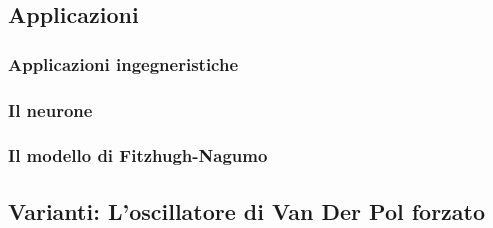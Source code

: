 \documentclass[12pt]{article}
\begin{document}
\subsection{Applicazioni}
\subsubsection{Applicazioni ingegneristiche \\}
\subsubsection{Il neurone \\}
\subsubsection{Il modello di Fitzhugh-Nagumo \\}
\subsection{Varianti: L'oscillatore di Van Der Pol forzato}
\end{document}
